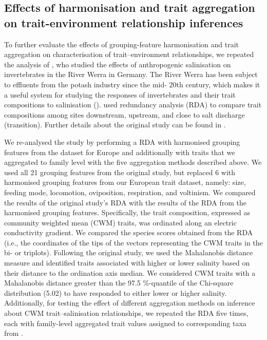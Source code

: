 \documentclass{article}
\begin{document}

\subsection*{Effects of harmonisation and trait aggregation on trait-environment relationship inferences}

To further evaluate the effects of grouping-feature harmonisation and trait aggregation on characterisation of trait–environment relationships, we repeated the analysis of \citet{szocs_effects_2014}, who studied the effects of anthropogenic salinisation on invertebrates in the River Werra in Germany. The River Werra has been subject to effluents from the potash industry since the mid- 20th century, which makes it a useful system for studying the responses of invertebrates and their trait compositions to salinisation (\cite{bathe_biological_2011}). \citet{szocs_effects_2014}  used redundancy analysis (RDA) to compare trait compositions among sites downstream, upstream, and close to salt discharge (transition). Further details about the original study can be found in \citet{szocs_effects_2014}.

We re-analysed the \citet{szocs_effects_2014} study by performing a RDA with harmonised grouping features from the dataset for Europe and additionally with traits that we aggregated to family level with the five aggregation methods described above. We used all 21 grouping features from the original study, but replaced 6 with harmonised grouping features from our European trait dataset, namely: size, feeding mode, locomotion, oviposition, respiration, and voltinism.
We compared the results of the original study’s RDA with the results of the RDA from the harmonised grouping features. Specifically, the trait composition, expressed as community weighted mean (CWM) traits, was ordinated along an electric conductivity gradient. We compared the species scores obtained from the RDA (i.e., the coordinates of the tips of the vectors representing the CWM traits in the bi- or triplots). Following the original study, we used the Mahalanobis distance measure and identified traits associated with higher or lower salinity based on their distance to the ordination axis median. We considered CWM traits with a Mahalanobis distance greater than the 97.5 \%-quantile of the Chi-square distribution (5.02) to have responded to either lower or higher salinity. Additionally, for testing the effect of different aggregation methods on inference about CWM trait–salinisation relationships, we repeated the RDA five times, each with family-level aggregated trait values assigned to corresponding taxa from \citet{szocs_effects_2014}.
\end{document}
